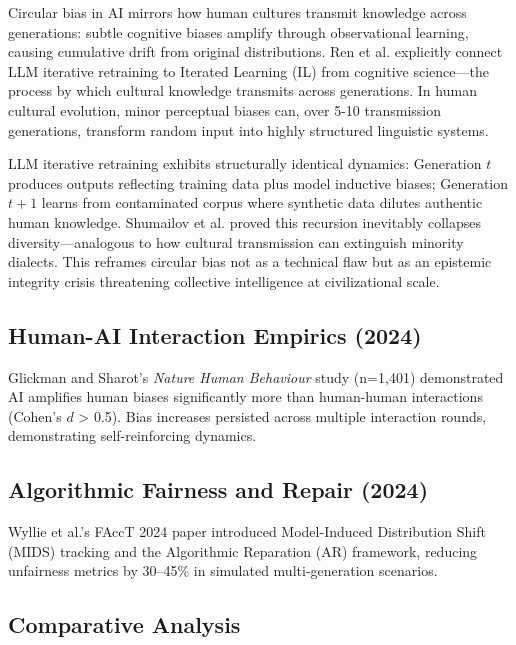 \documentclass[11pt]{article}
\begin{document}
\begin{tcolorbox}[colback=gray!10,colframe=black,title=\textbf{Box 1 | Distorted Cultural Transmission}]
Circular bias in AI mirrors how human cultures transmit knowledge across generations: subtle cognitive biases amplify through observational learning, causing cumulative drift from original distributions. Ren et al.\cite{ren2024} explicitly connect LLM iterative retraining to Iterated Learning (IL) from cognitive science—the process by which cultural knowledge transmits across generations. In human cultural evolution, minor perceptual biases can, over 5-10 transmission generations, transform random input into highly structured linguistic systems.

LLM iterative retraining exhibits structurally identical dynamics: Generation $t$ produces outputs reflecting training data plus model inductive biases; Generation $t+1$ learns from contaminated corpus where synthetic data dilutes authentic human knowledge. Shumailov et al.\cite{shumailov2024} proved this recursion inevitably collapses diversity—analogous to how cultural transmission can extinguish minority dialects. This reframes circular bias not as a technical flaw but as an epistemic integrity crisis threatening collective intelligence at civilizational scale.
\end{tcolorbox}

\subsection{Human-AI Interaction Empirics (2024)}

Glickman and Sharot's\cite{glickman2024} \textit{Nature Human Behaviour} study (n=1,401) demonstrated AI amplifies human biases significantly more than human-human interactions (Cohen's $d$ > 0.5). Bias increases persisted across multiple interaction rounds, demonstrating self-reinforcing dynamics.

\subsection{Algorithmic Fairness and Repair (2024)}

Wyllie et al.'s\cite{wyllie2024} FAccT 2024 paper introduced Model-Induced Distribution Shift (MIDS) tracking and the Algorithmic Reparation (AR) framework, reducing unfairness metrics by 30–45\% in simulated multi-generation scenarios.

\subsection{Comparative Analysis}
\end{document}
